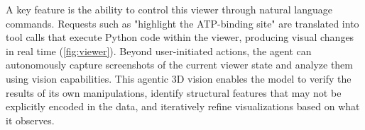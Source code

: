 \documentclass[journal=jcisd8,manuscript=article]{achemso}
\begin{document}
A key feature is the ability to control this viewer through natural language commands. Requests such as "highlight the ATP-binding site" are translated into tool calls that execute Python code within the viewer, producing visual changes in real time (\cref{fig:viewer}). Beyond user-initiated actions, the agent can autonomously capture screenshots of the current viewer state and analyze them using vision capabilities. This agentic 3D vision enables the model to verify the results of its own manipulations, identify structural features that may not be explicitly encoded in the data, and iteratively refine visualizations based on what it observes. 


\end{document}
